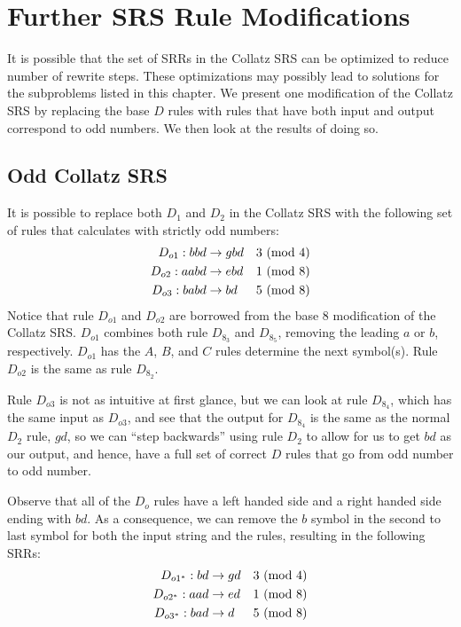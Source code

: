 \section{Further SRS Rule Modifications}\label{subsec:srsrulemod}
It is possible that the set of SRRs in the Collatz SRS can be optimized to reduce number of rewrite steps. These optimizations may possibly lead to solutions for the subproblems listed in this chapter. We present one modification of the Collatz SRS by replacing the base $D$ rules with rules that have both input and output correspond to odd numbers. We then look at the results of doing so.
\subsection{Odd Collatz SRS}\label{subsubsec:evenruleremove}
It is possible to replace both $D_1$ and $D_2$ in the Collatz SRS with the following set of rules that calculates with strictly odd numbers:
\begin{align*}
    D_{o1}: bbd &\rightarrow gbd &\text{$3\ (\mathrm{mod}\ 4)$}\\
    D_{o2}: aabd &\rightarrow ebd &\text{$1\ (\mathrm{mod}\ 8)$}\\
    D_{o3}: babd &\rightarrow bd &\text{$5\ (\mathrm{mod}\ 8)$}
\end{align*}
Notice that rule $D_{o1}$ and $D_{o2}$ are borrowed from the base 8 modification of the Collatz SRS. $D_{o1}$ combines both rule $D_{8_3}$ and $D_{8_5}$, removing the leading $a$ or $b$, respectively. $D_{o1}$ has the $A$, $B$, and $C$ rules determine the next symbol(s). Rule $D_{o2}$ is the same as rule $D_{8_2}$.\par
Rule $D_{o3}$ is not as intuitive at first glance, but we can look at rule $D_{8_4}$, which has the same input as $D_{o3}$, and see that the output for $D_{8_4}$ is the same as the normal $D_2$ rule, $gd$, so we can ``step backwards'' using rule $D_2$ to allow for us to get $bd$ as our output, and hence, have a full set of correct $D$ rules that go from odd number to odd number.\par
Observe that all of the $D_o$ rules have a left handed side and a right handed side ending with $bd$. As a consequence, we can remove the $b$ symbol in the second to last symbol for both the input string and the rules, resulting in the following SRRs:
\begin{align*}
    D_{o1^*}: bd &\rightarrow gd &\text{$3\ (\mathrm{mod}\ 4)$}\\
    D_{o2^*}: aad &\rightarrow ed &\text{$1\ (\mathrm{mod}\ 8)$}\\
    D_{o3^*}: bad &\rightarrow d &\text{$5\ (\mathrm{mod}\ 8)$}
\end{align*}
